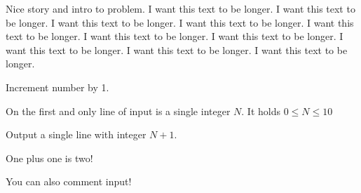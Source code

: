 





Nice story and intro to problem.
I want this text to be longer. I want this text to be longer. 
I want this text to be longer. I want this text to be longer. 
I want this text to be longer. I want this text to be longer. 
I want this text to be longer. I want this text to be longer. 
I want this text to be longer. I want this text to be longer.




Increment number by 1.


On the first and only line of input is a single integer $N$.
It holds $0 \leq N \leq 10$


Output a single line with integer $N+1$.



\sampleCOMMENT
One plus one is two!
\sampleEND


\bigskip


\sampleCOMMENT
You can also comment input!
\sampleEND



